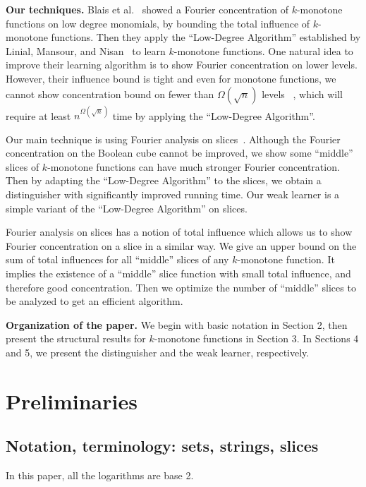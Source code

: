 \documentclass[11pt]{article}
\numberwithin{equation}{section}
\theoremstyle{definition}
\theoremstyle{plain}
\newcommand{\warn}[1]{#1}
\begin{document}
\vspace{2ex}
%
\noindent\textbf{Our techniques.} %
Blais et al.~\cite{BCOST15} showed a Fourier concentration of $k$-monotone functions on low degree monomials, by bounding the total
influence of $k$-monotone functions. Then they apply the
``Low-Degree Algorithm'' established by
Linial, Mansour, and Nisan~\cite{LMN93} to learn $k$-monotone functions. One natural idea to improve their learning algorithm is to show Fourier concentration on lower levels. However,
their influence bound is tight and even for monotone functions, we cannot show  concentration bound on fewer than $\Omega(\sqrt{n})$ levels ~\cite{DFTWW14}, which will require at least $n^{\Omega(\sqrt{n})}$ time by applying the ``Low-Degree Algorithm''.

Our main technique is using Fourier analysis on slices~\cite{Filmus,srinivasan2011symmetric}. Although the Fourier concentration on the Boolean cube cannot be improved, we show some ``middle'' slices of $k$-monotone functions can have much stronger Fourier concentration.  Then by adapting the ``Low-Degree Algorithm'' to the slices, we obtain a distinguisher with significantly improved running time. Our weak learner is a simple variant of the ``Low-Degree Algorithm'' on slices.

Fourier analysis on slices has a notion of total influence which allows us to show Fourier concentration on a slice in a similar way. We give an upper bound on the sum of total influences for all ``middle'' slices of any $k$-monotone function. It implies the existence of a ``middle'' slice function with small total influence, and therefore good concentration. Then we optimize the number of ``middle'' slices to be analyzed to get an efficient algorithm.

\vspace{2ex}
%
%
\noindent\textbf{Organization of the paper.} %
We begin with %
%
basic notation  %
in Section 2, then present the structural results for $k$-monotone functions
in Section 3. In Sections 4 and 5, we present the distinguisher and
the  %
%
%
weak learner, respectively.  %

\section{Preliminaries}
%
%
%
\subsection{Notation, terminology: sets, strings, slices}
\warn{In this paper, all the logarithms are base 2.}
\end{document}
